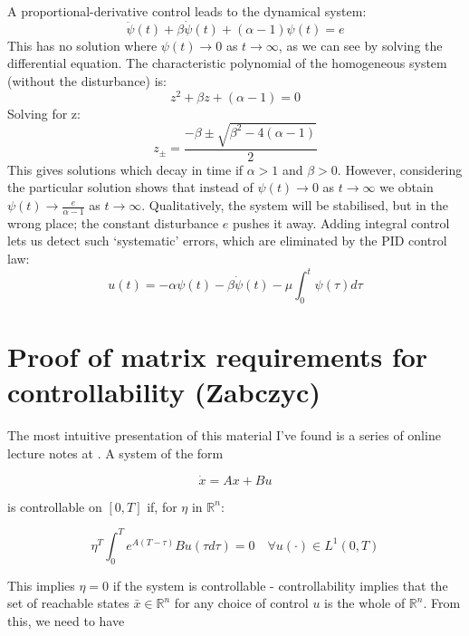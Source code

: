 \documentclass[11pt]{article} %
\begin{document}
 A proportional-derivative control leads to the dynamical system:
\begin{equation}
\ddot{\psi}(t) + \beta\dot{\psi}(t) + (\alpha - 1)\psi(t) = e
\end{equation}
This has no solution where $\psi(t) \to 0$ as $t \to \infty$, as we can see by solving the differential equation. The characteristic polynomial of the homogeneous system (without the disturbance) is:
\begin{equation}
z^{2}+\beta z + (\alpha - 1) = 0
\end{equation}
Solving for z:
\begin{equation}
z_{\pm} = \frac{-\beta \pm \sqrt{\beta^{2} - 4(\alpha - 1)}}{2}
\end{equation}
This gives solutions which decay in time if $\alpha > 1$ and $\beta > 0$. However, considering the particular solution shows that instead of $\psi(t) \to 0$ as $t \to \infty$ we obtain $\psi(t) \to \frac{e}{\alpha - 1}$ as $t \to \infty$. Qualitatively, the system will be stabilised, but in the wrong place; the constant disturbance $e$ pushes it away. Adding integral control lets us detect such `systematic' errors, which are eliminated by the PID control law:
\begin{equation}
u(t) = -\alpha\psi(t) - \beta\dot{\psi}(t) - \mu\int^{t}_{0}\psi(\tau)d\tau
\end{equation}

\section{Proof of matrix requirements for controllability (Zabczyc)}
The most intuitive presentation of this material I've found is a series of online lecture notes at \cite{controllability}. A system of the form

\begin{equation}
\dot{x} = Ax + Bu
\end{equation}

is controllable on $[0, T]$ if, for $\eta$ in $\mathbb{R}^{n}$:

\begin{equation}
\eta^{T} \int^{T}_{0}e^{A(T - \tau)}B u(\tau d \tau) = 0 \quad \forall u(\cdot) \in L^{1}(0,T)
\end{equation}

This implies $\eta = 0$ if the system is controllable - controllability implies that the set of reachable states $\bar{x} \in \mathbb{R}^{n}$ for any choice of control $u$ is the whole of $\mathbb{R}^{n}$. From this, we need to have
\end{document}
